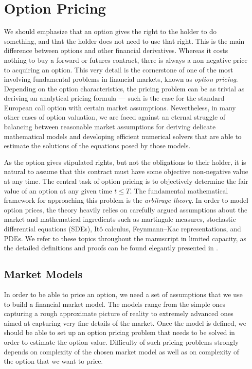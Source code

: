 \documentclass{UUThesisTemplate}
\begin{document}
\chapter{Option Pricing}
\label{ch:optionpricing}
\par We should emphasize that an option gives the right to the holder to do something, and that the holder does not need to use that right. This is the main difference between options and other financial derivatives. Whereas it costs nothing to buy a forward or futures contract, there is always a non-negative price to acquiring an option. This very detail is the cornerstone of one of the most involving fundamental problems in financial markets, known as \emph{option pricing}. Depending on the option characteristics, the pricing problem can be as trivial as deriving an analytical pricing formula --- such is the case for the standard European call option with certain market assumptions. Nevertheless, in many other cases of option valuation, we are faced against an eternal struggle of balancing between reasonable market assumptions for deriving delicate mathematical models and developing efficient numerical solvers that are able to estimate the solutions of the equations posed by those models.
\par As the option gives stipulated rights, but not the obligations to their holder, it is natural to assume that this contract must have some objective non-negative value at any time. The central task of option pricing is to objectively determine the fair value of an option at any given time $t \leq T$. The fundamental mathematical framework for approaching this problem is the \emph{arbitrage theory}. In order to model option prices, the theory heavily relies on carefully argued assumptions about the market and mathematical ingredients such as martingale measures, stochastic differential equations (SDEs), It\^o calculus, Feynmann--Kac representations, and PDEs. We refer to these topics throughout the manuscript in limited capacity, as the detailed definitions and proofs can be found elegantly presented in \cite{bjork2009arbitrage}.
%
\section{Market Models}
\label{sec:models}
\par In order to be able to price an option, we need a set of assumptions that we use to build a financial market model. The models range from the simple ones capturing a rough approximate picture of reality to extremely advanced ones aimed at capturing very fine details of the market. Once the model is defined, we should be able to set up an option pricing problem that needs to be solved in order to estimate the option value. Difficulty of such pricing problems strongly depends on complexity of the chosen market model as well as on complexity of the option that we want to price.  
%
\end{document}
